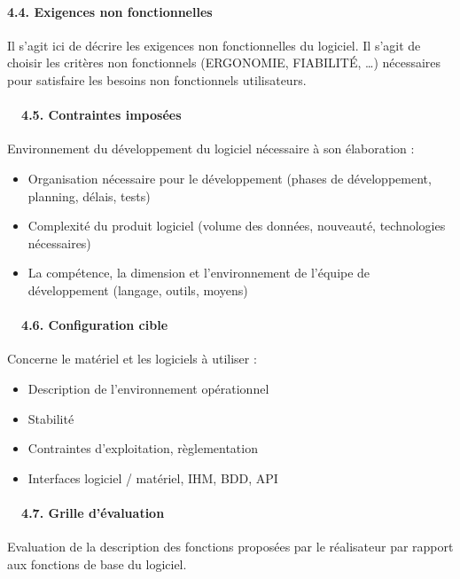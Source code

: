 \documentclass{article}
\begin{document}
\bigskip


\bigskip

\paragraph[4.4. Exigences non fonctionnelles]{4.4. Exigences non
fonctionnelles}
Il s’agit ici de décrire les exigences non fonctionnelles du logiciel.
Il s’agit de choisir les critères non fonctionnels (ERGONOMIE,
FIABILITÉ, …) nécessaires pour satisfaire les besoins non fonctionnels
utilisateurs.


\bigskip

\paragraph[\ \ 4.5. Contraintes imposées]{\ \ 4.5. Contraintes imposées}
Environnement du développement du logiciel nécessaire à son élaboration 
:

\begin{itemize}
\item Organisation nécessaire pour le développement (phases de
développement, planning, délais, tests)
\item Complexité du produit logiciel (volume des données, nouveauté,
technologies nécessaires)
\item La compétence, la dimension et l’environnement de l’équipe de
développement (langage, outils, moyens)
\end{itemize}

\bigskip

\paragraph[\ \ 4.6. Configuration cible]{\ \ 4.6. Configuration cible}
Concerne le matériel et les logiciels à utiliser :

\begin{itemize}
\item Description de l’environnement opérationnel
\item Stabilité
\item Contraintes d’exploitation, règlementation
\item Interfaces logiciel / matériel, IHM, BDD, API
\end{itemize}

\bigskip

\paragraph[\ \ 4.7. Grille d’évaluation]{\ \ 4.7. Grille d’évaluation}
Evaluation de la description des fonctions proposées par le réalisateur
par rapport aux fonctions de base du logiciel.\newline
\end{document}

